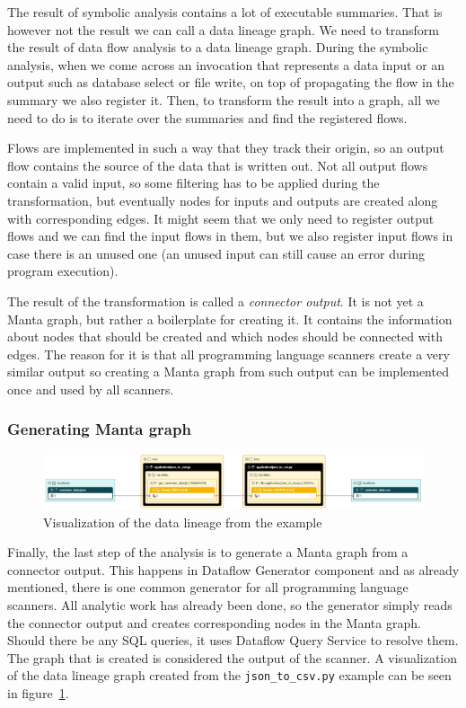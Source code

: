 The result of symbolic analysis contains a lot of executable summaries. That is however not the result we can call a data lineage graph. We need to transform the result of data flow analysis to a data lineage graph. During the symbolic analysis, when we come across an invocation that represents a data input or an output such as database select or file write, on top of propagating the flow in the summary we also register it. Then, to transform the result into a graph, all we need to do is to iterate over the summaries and find the registered flows.
\par
Flows are implemented in such a way that they track their origin, so an output flow contains the source of the data that is written out. Not all output flows contain a valid input, so some filtering has to be applied during the transformation, but eventually nodes for inputs and outputs are created along with corresponding edges. It might seem that we only need to register output flows and we can find the input flows in them, but we also register input flows in case there is an unused one (an unused input can still cause an error during program execution).
\par
The result of the transformation is called a \textit{connector output}. It is not yet a Manta graph, but rather a boilerplate for creating it. It contains the information about nodes that should be created and which nodes should be connected with edges. The reason for it is that all programming language scanners create a very similar output so creating a Manta graph from such output can be implemented once and used by all scanners.

\subsubsection{Generating Manta graph}

\begin{figure}[ht]\centering
\includegraphics[width=1.0\textwidth]{img/json_to_csv.PNG}
\caption{Visualization of the data lineage from the example}
\label{fig:lineage}
\end{figure}  

Finally, the last step of the analysis is to generate a Manta graph from a connector output. This happens in Dataflow Generator component and as already mentioned, there is one common generator for all programming language scanners. All analytic work has already been done, so the generator simply reads the connector output and creates corresponding nodes in the Manta graph. Should there be any SQL queries, it uses Dataflow Query Service to resolve them. The graph that is created is considered the output of the scanner. A visualization of the data lineage graph created from the \texttt{json\_to\_csv.py} example can be seen in figure~\ref{fig:lineage}.